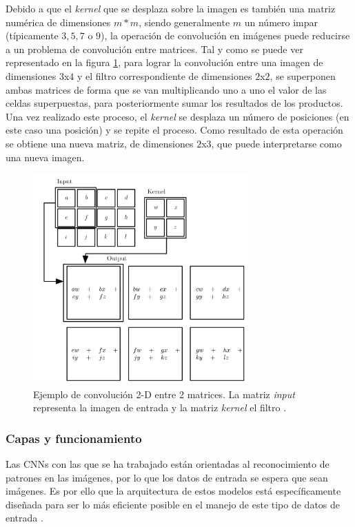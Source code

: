 Debido a que el \textit{kernel} que se desplaza sobre la imagen es también una matriz numérica de dimensiones $m*m$, siendo generalmente $m$ un número impar (típicamente $3, 5, 7$ o $9$), la operación de convolución en imágenes puede reducirse a un problema de convolución entre matrices. Tal y como se puede ver representado en la figura \ref{fig:convolucion}, para lograr la convolución entre una imagen de dimensiones $3$x$4$ y el filtro correspondiente de dimensiones $2$x$2$, se superponen ambas matrices de forma que se van multiplicando uno a uno el valor de las celdas superpuestas, para posteriormente sumar los resultados de los productos. Una vez realizado este proceso, el \textit{kernel} se desplaza un número de posiciones (en este caso una posición) y se repite el proceso. Como resultado de esta operación se obtiene una nueva matriz, de dimensiones  $2$x$3$, que puede interpretarse como una nueva imagen.

\begin{figure}[h]
    \centering
    \includegraphics[width=0.75\textwidth]{img/convolucion.png}
    \caption{Ejemplo de convolución 2-D entre 2 matrices. La matriz \textit{input} representa la imagen de entrada y la matriz \textit{kernel} el filtro \cite{cnn:biblia_deeplearning}.}
    \label{fig:convolucion}
\end{figure}

\subsubsection{Capas y funcionamiento}

Las CNNs con las que se ha trabajado están orientadas al reconocimiento de patrones en las imágenes, por lo que los datos de entrada se espera que sean imágenes. Es por ello que la arquitectura de estos modelos está específicamente diseñada para ser lo más eficiente posible en el manejo de este tipo de datos de entrada \cite{cnn:osea}. 

